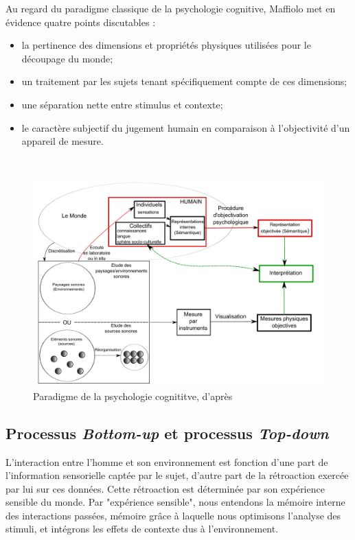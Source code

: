 Au regard du paradigme classique de la psychologie cognitive, Maffiolo met en évidence quatre points discutables :

\begin{itemize}
\item la pertinence des dimensions et propriétés physiques utilisées pour le découpage du monde;
\item un traitement par les sujets tenant spécifiquement compte de ces dimensions;
\item une séparation nette entre stimulus et contexte;
\item le caractère subjectif du jugement humain en comparaison à l'objectivité d'un appareil de mesure.
\end{itemize}

 \\

\begin{figure}[t]
        \myfloatalign
        \includegraphics[width=\linewidth]{gfx/Shema_maffiolo}
        \caption[Paradigme de la psychologie cognititve]{Paradigme de la psychologie cognititve, d'après \citep{maffiolo_caracterisation_1999}}\label{fig:paradigmePsychoCo}
\end{figure}

\subsection{Processus \emph{Bottom-up} et processus \emph{Top-down}}
\label{sec:ch3_butd}

L'interaction entre l'homme et son environnement est fonction d'une part de l'information sensorielle captée par le sujet, d'autre part de la rétroaction exercée par lui sur ces données. Cette rétroaction est déterminée par son expérience sensible du monde. Par "expérience sensible", nous entendons la mémoire interne des interactions passées, mémoire grâce à laquelle nous optimisons l'analyse des stimuli, et intégrons les effets de contexte dus à l'environnement.

